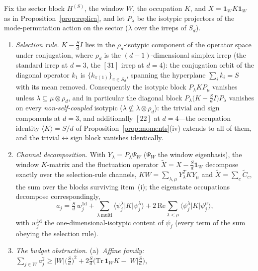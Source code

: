 \begin{proposition}\label{prop:dipole}
Fix the sector block $H^{(S)}$, the window $W$, the occupation $K$, and
$X=\mathbf{1}_WK\mathbf{1}_W$ as in Proposition~\ref{prop:replica}, and let
$P_{\lambda}$ be the isotypic projectors of the mode-permutation action on
the sector ($\lambda$ over the irreps of $S_d$).
\begin{enumerate}[leftmargin=1.6em]
\item \emph{Selection rule.} $K-\tfrac{S}{d}I$ lies in the
$\rho_d$-isotypic component of the operator space under conjugation, where
$\rho_d$ is the $(d-1)$-dimensional simplex irrep (the standard irrep at
$d=3$, the $[31]$ irrep at $d=4$): the conjugation orbit of the diagonal
operator $k_1$ is $\{k_{\pi(1)}\}_{\pi\in S_d}$, spanning the hyperplane
$\sum_ik_i=S$ with its mean removed. Consequently the isotypic block
$P_{\lambda}KP_{\mu}$ vanishes unless $\lambda\subseteq\mu\otimes\rho_d$,
and in particular the diagonal block
$P_{\lambda}\bigl(K-\tfrac{S}{d}I\bigr)P_{\lambda}$ vanishes on every
\emph{non-self-coupled} isotypic ($\lambda\not\subseteq\lambda\otimes
\rho_d$): the trivial and sign components at $d=3$, and additionally $[22]$
at $d=4$---the occupation identity $\langle K\rangle=S/d$ of
Proposition~\ref{prop:moments}(iv) extends to all of them, and the
trivial$\leftrightarrow$sign block vanishes identically.
\item \emph{Channel decomposition.} With $Y_{\lambda}=P_{\lambda}\Psi_W$
($\Psi_W$ the window eigenbasis), the window $K$-matrix and the
fluctuation operator $\widetilde X=X-\tfrac{S}{d}\mathbf{1}_W$ decompose
exactly over the selection-rule channels,
$KW=\sum_{\lambda,\mu}Y_{\lambda}^{T}KY_{\mu}$ and
$\widetilde X=\sum_c\widetilde C_c$, the sum over the blocks surviving
item~(i); the eigenstate occupations decompose correspondingly,
\begin{equation*}
a_j=\tfrac{S}{d}\,w^{\mathrm{1d}}_j+\textstyle\sum_{\lambda\ \mathrm{multi}}
\langle\psi_j^{\lambda}|K|\psi_j^{\lambda}\rangle
+2\,\mathrm{Re}\sum_{\lambda<\mu}\langle\psi_j^{\lambda}|K|
\psi_j^{\mu}\rangle,
\end{equation*}
with $w^{\mathrm{1d}}_j$ the one-dimensional-isotypic content of
$\psi_j$ (every term of the sum obeying the selection rule).
\item \emph{The budget obstruction.} (a)~\emph{Affine family:}
$\sum_{j\in W}a_j^{2}\ge|W|\bigl(\tfrac{S}{d}\bigr)^{2}
+2\tfrac{S}{d}\bigl(\mathrm{Tr}\,\mathbf{1}_WK-|W|\tfrac{S}{d}\bigr)$,

\end{enumerate}
\end{proposition}
